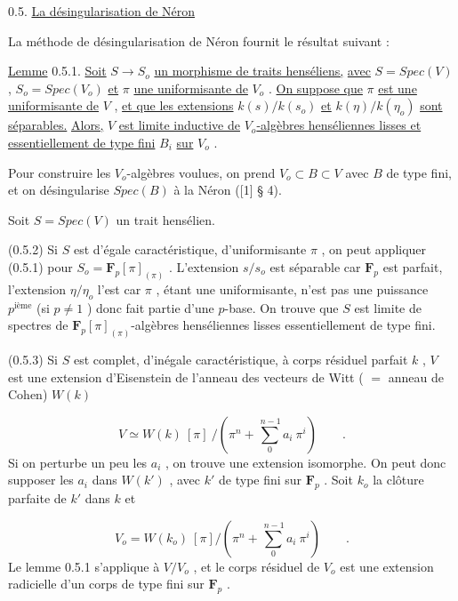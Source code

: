 0.5.  \underline{La désingularisation de Néron}

La méthode de désingularisation de Néron fournit le résultat suivant :

\underline{Lemme} 0.5.1.  \underline{Soit}  $S \longrightarrow S_o$  \underline{un morphisme de traits henséliens,}  \underline{avec}  $S = Spec(V)$ ,  $S_o = Spec(V_o)$  \underline{et}  $\pi$  \underline{une uniformisante de}  $V_o$ .  \underline{On suppose que}  $\pi$  \underline{est une uniformisante de}  $V$ ,  \underline{et que les extensions}  $k(s)/k(s_o)$  \underline{et}  $k(\eta)/k(\eta_o)$  \underline{sont séparables.}  \underline{Alors,}  $V$  \underline{est limite inductive de}  $V_o$\underline{-algèbres henséliennes lisses et essentiellement de type fini}  $B_i$  \underline{sur}  $V_o$ .



Pour construire les  $V_o$-algèbres voulues, on prend  $V_o \subset B \subset V$  avec  $B$  de type fini, et on désingularise  $Spec(B)$  à la Néron  ([1]  § 4).

Soit  $S = Spec(V)$  un trait hensélien.

(0.5.2)  Si  $S$  est d'égale caractéristique, d'uniformisante  $\pi$ , on peut appliquer (0.5.1) pour  $S_o = \mathbf{F}_p[\pi]_{(\pi)}$ . L'extension  $s/s_o$  est séparable car  $\mathbf{F}_p$  est parfait, l'extension  $\eta/\eta_o$  l'est car  $\pi$ , étant une uniformisante, n'est pas une puissance  $p^{\text{ième}}$  (si  $p \neq 1$ ) donc fait partie d'une $p$-base. On trouve que  $S$  est limite de spectres de  $\mathbf{F}_p[\pi]_{(\pi)}$-algèbres henséliennes lisses essentiellement de type fini.

(0.5.3)  Si  $S$  est complet, d'inégale caractéristique, à corps résiduel parfait  $k$ , $V$  est une extension d'Eisenstein de l'anneau des vecteurs de Witt  ( $=$ anneau de Cohen)  $W(k)$

\begin{equation*}
V \simeq W(k) \ [\pi] \ /(\pi^n + \sum_0^{\,n-1} a_i \ \pi^i) \qquad .
\end{equation*}
Si on perturbe un peu les  $a_i$ , on trouve une extension isomorphe. On peut donc supposer les  $a_i$  dans  $W(k')$ , avec  $k'$  de type fini sur  $\mathbf{F}_p$ . Soit  $k_o$  la clôture parfaite de  $k'$  dans  $k$ et

\begin{equation*}
V_o = W(k_o) \ [\pi]/(\pi^n + \sum_0^{\,n-1} a_i \ \pi^i) \qquad .
\end{equation*}
Le lemme 0.5.1 s'applique à  $V/V_o$ , et le corps résiduel de  $V_o$  est une extension radicielle d'un corps de type fini sur  $\mathbf{F}_p$  .


